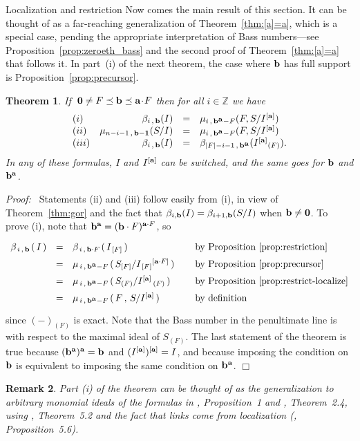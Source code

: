 \documentclass[12pt,leqno]{article}
\newtheorem{thm}{Theorem}[section]
\newtheorem{remark}[thm]{Remark}
\def\aa{{{\rm \bf a}}}
\def\bb{{{\rm \bf b}}}
\def\ZZ{{\mathbb Z}}
\begin{document}
\begin{section}{Localization and restriction}
Now comes the main result of this section.  It can be thought of as a
far-reaching generalization of Theorem~\ref{thm:[a]=a}, which is a
special case, pending the appropriate interpretation of Bass
numbers---see Proposition~\ref{prop:zeroeth_bass} and the second proof of
Theorem~\ref{thm:[a]=a} that follows it.  In part~(i) of the next
theorem, the case where $\bb$ has full support is
Proposition~\ref{prop:precursor}.
\begin{thm} \label{thm:bass-betti}
If $\:{\bf 0} \neq F \preceq \bb \preceq \aa \!\cdot\! F$ then for all $i
\in \ZZ$ we have
$$
\begin{array}{lrcl}
(i)
&	\beta_{i\,,\,\bb}(I) 
& = &
	\mu_{i\,,\,\bb^{\scriptstyle \aa} - F}(F,S/I^{[\aa]})
\cr
(ii)
&	\mu_{n-i-1\,,\,\bb - {\bf 1}}(S/I)
& = &
	\mu_{i\,,\,\bb^{\scriptstyle \aa} - F}(F,S/I^{[\aa]})
\cr
(iii)
&	\beta_{i\,,\,\bb}(I)
& = &
	\beta_{|F|-i-1\,,\,\bb^{\scriptstyle \aa}}
	(I^{[\aa]}{}_{(F)}).
\cr
\end{array}
$$
In any of these formulas, $I$ and $I^{[\aa]}$ can be switched, and the
same goes for $\bb$ and $\bb^\aa$.
\end{thm}
{\it Proof:\ } Statements (ii) and (iii) follow easily from (i), in view
of Theorem~\ref{thm:gor} and the fact that $\beta_{i,\bb}(I) =
\beta_{i+1,\bb}(S/I)$ when $\bb \neq {\bf 0}$.  To prove (i), note that
$\bb^\aa = (\bb \cdot F)^{\aa \cdot F}$, so
$$
\begin{array}{rcll}
\beta_{\,i\,,\,\bb\,}(\,I\,)
& = &
	\beta_{\,i\,,\,\bb \cdot F\,}(\,I_{\,[F]}\,)
	\phantom{\Bigl(\Bigr)}
&	\hbox{by Proposition~\ref{prop:restriction}}
\cr
& = &
	\mu_{\,i\,,\,\bb^{\scriptstyle \aa} - F\,}
		(\,S_{[F]} / I_{\,[F]}{}^{[\aa \cdot F]}\,) 
	\phantom{\Bigl(\Bigr)}
&	\hbox{by Proposition~\ref{prop:precursor}}
\cr
& = &
	\mu_{\,i\,,\,\bb^{\scriptstyle \aa} - F\,}
		(\,S_{(F)} / I^{[\aa]}{}_{\,(F)}\,) 
	\phantom{\Bigl(\Bigr)}
&	\hbox{by Proposition~\ref{prop:restrict-localize}}
\cr
& = &
	\mu_{\,i\,,\,\bb^{\scriptstyle \aa} - F\,}
		(\,F\,,\,S / I^{[\aa]}\,) 
	\phantom{\Bigl(\Bigr)}
&	\hbox{by definition}
\cr
\end{array}
$$
since $(-)_{(F)}$ is exact.  Note that the Bass number in the penultimate
line is with respect to the maximal ideal of $S_{(F)}$.  The last
statement of the theorem is true because $(\bb^\aa)^\aa = \bb$ and
$(I^{[\aa]})^{[\aa]} = I$, and because imposing the condition on $\bb$ is
equivalent to imposing the same condition on $\bb^\aa$.
%
\hfill
$\Box$

\begin{remark} \rm
Part (i) of the theorem can be thought of as the generalization to
arbitrary monomial ideals of the formulas in \cite{ER}, Proposition~1 and
\cite{BCP}, Theorem~2.4, using \cite{Hoc}, Theorem~5.2 and the fact that
links come from localization (\cite{Hoc}, Proposition~5.6).
\end{remark}


\end{section}
\end{document}
